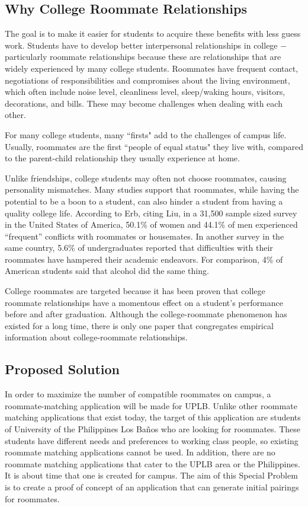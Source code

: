 \documentclass[journal]{./IEEE/IEEEtran}
\newcommand{\UPLB}{University of the Philippines Los Ba\~{n}os }
\begin{document}
    \subsection{Why College Roommate Relationships}
    The goal is to make it easier for students to acquire these benefits with less guess work. Students have to develop better interpersonal relationships in college $-$ particularly roommate relationships because these are relationships that are widely experienced by many college students\cite{erb}. Roommates have frequent contact, negotiations of responsibilities and compromises about the living environment, which often include noise level, cleanliness level, sleep/waking hours, visitors, decorations, and bills\cite{erb}. These may become challenges when dealing with each other.

    For many college students, many {``firsts"} add to the challenges of campus life. Usually, roommates are the first {``people of equal status"} they live with, compared to the parent-child relationship they usually experience at home\cite{erb}.

    Unlike friendships, college students may often not choose roommates, causing personality mismatches. Many studies support that roommates, while having the potential to be a boon to a student, can also hinder a student from having a quality college life. According to Erb\cite{erb}, citing Liu\cite{liu}, in a 31,500 sample sized survey in the United States of America, 50.1\% of women and 44.1\% of men experienced “frequent” conflicts with roommates or housemates. In another survey in the same country, 5.6\% of undergraduates reported that difficulties with their roommates have hampered their academic endeavors\cite{erb}. For comparison, 4\% of American students said that alcohol did the same thing\cite{erb}.

    College roommates are targeted because it has been proven that college roommate relationships have a momentous effect on a student's performance before and after graduation. Although the college-roommate phenomenon has existed for a long time, there is only one paper that congregates empirical information about college-roommate relationships\cite{erb}.

    \subsection{Proposed Solution}
    In order to maximize the number of compatible roommates on campus, a roommate-matching application will be made for
    UPLB. Unlike other roommate matching applications that exist today, the target of this application are students of
    \UPLB who are looking for roommates. These students have different needs and preferences to working class people, so existing roommate matching applications cannot be used. In addition, there are no roommate matching applications that cater to the UPLB area or the Philippines. It is about time that one is created for campus. The aim of this Special Problem is to create a proof of concept of an application that can generate initial pairings for roommates.
\end{document}
